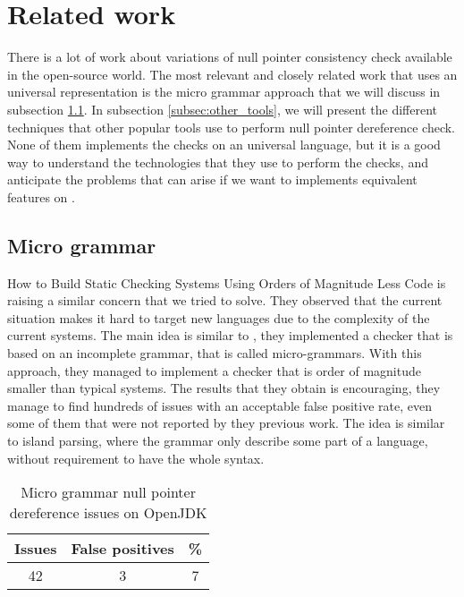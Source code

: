 \section{Related work}
\label{sec:related_work}

There is a lot of work about variations of null pointer consistency check available in the open-source world.
The most relevant and closely related work that uses an universal representation is the micro grammar approach \cite{Brown:2016:BSC:2954679.2872364} that we will discuss in subsection \ref{subsec:micro_grammar}.
In subsection \ref{subsec:other_tools}, we will present the different techniques that other popular tools use to perform null pointer dereference check.
None of them implements the checks on an universal language, but it is a good way to understand the technologies that they use to perform the checks, and anticipate the problems that can arise if we want to implements equivalent features on \slang{}.

\subsection{Micro grammar}
\label{subsec:micro_grammar}

How to Build Static Checking Systems Using Orders of Magnitude Less Code \cite{Brown:2016:BSC:2954679.2872364} is raising a similar concern that we tried to solve. 
They observed that the current situation makes it hard to target new languages due to the complexity of the current systems. 
The main idea is similar to \slang{}, they implemented a checker that is based on an incomplete grammar, that is called micro-grammars.
With this approach, they managed to implement a checker that is order of magnitude smaller than typical systems.
The results that they obtain is encouraging, they manage to find hundreds of issues with an acceptable false positive rate, even some of them that were not reported by they previous work. 
The idea is similar to island parsing, where the grammar only describe some part of a language, without requirement to have the whole syntax.

\begin{table}[h]
	\centering
	\caption{Micro grammar null pointer dereference issues on OpenJDK}
	\label{table:micro_grammar_issues}
	\begin{tabular}{|c|c|c|}
		\hline
		\bf Issues & \bf False positives & \bf \% \\ \hline
		42 &  3 &  7 \\ \hline
	\end{tabular}
\end{table}

